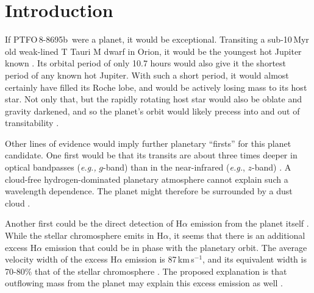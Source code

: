 \documentclass[12pt,twocolumn,tighten]{aastex62}
\newcommand{\ptfob}{PTFO$\,$8-8695b}
\begin{document}

\section{Introduction}
If \ptfob\ were a planet, it would be exceptional.  Transiting a
sub-10$\,$Myr old weak-lined T Tauri M dwarf in Orion, it would be the
youngest hot Jupiter known \citep{van_eyken_ptf_2012}.  Its orbital
period of only 10.7 hours would also give it the shortest period of
any known hot Jupiter.  With such a short period, it would almost
certainly have filled its Roche lobe, and would be actively losing
mass to its host star.  Not only that, but the rapidly rotating host
star would also be oblate and gravity darkened, and so the planet's
orbit would likely precess into and out of transitability
\citep{barnes_measurement_2013,ciardi_followup_2015,kamiaka_revisiting_2015}. 

Other lines of evidence would imply further planetary ``firsts'' for
this planet candidate.  One first would be that its transits are about
three times deeper in optical bandpasses ({\it e.g.,} $g$-band) than
in the near-infrared ({\it e.g.}, $z$-band)
\citep{onitsuka_multicolor_2017,tanimoto_evidence_2020}.  A cloud-free
hydrogen-dominated planetary atmosphere cannot explain such a
wavelength dependence.  The planet might therefore be surrounded by a
dust cloud \citep{tanimoto_evidence_2020}.  

Another first could be the direct detection of H$\alpha$ emission from
the planet itself \citep{johnskrull_h_2016}.  While the stellar
chromosphere emits in H$\alpha$, it seems that there is an additional
excess H$\alpha$ emission that could be in phase with the planetary
orbit.  The average velocity width of the excess H$\alpha$ emission is
87$\,$km$\,$s$^{-1}$, and its equivalent width is 70-80\% that of the
stellar chromosphere \citep{johnskrull_h_2016}.  The proposed
explanation is that outflowing mass from the planet may explain this
excess emission as well \citep{johnskrull_h_2016}.
\end{document}
